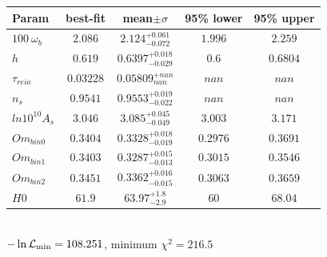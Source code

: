 \begin{tabular}{|l|c|c|c|c|} 
 \hline 
Param & best-fit & mean$\pm\sigma$ & 95\% lower & 95\% upper \\ \hline 
$100~\omega{}_{b }$ &$2.086$ & $2.124_{-0.072}^{+0.061}$ & $1.996$ & $2.259$ \\ 
$h$ &$0.619$ & $0.6397_{-0.029}^{+0.018}$ & $0.6$ & $0.6804$ \\ 
$\tau{}_{reio }$ &$0.03228$ & $0.05809_{nan}^{+nan}$ & $nan$ & $nan$ \\ 
$n_{s }$ &$0.9541$ & $0.9553_{-0.022}^{+0.019}$ & $nan$ & $nan$ \\ 
$ln10^{10}A_{s }$ &$3.046$ & $3.085_{-0.049}^{+0.045}$ & $3.003$ & $3.171$ \\ 
$Om_{bin0 }$ &$0.3404$ & $0.3328_{-0.019}^{+0.018}$ & $0.2976$ & $0.3691$ \\ 
$Om_{bin1 }$ &$0.3403$ & $0.3287_{-0.013}^{+0.015}$ & $0.3015$ & $0.3546$ \\ 
$Om_{bin2 }$ &$0.3451$ & $0.3362_{-0.015}^{+0.016}$ & $0.3063$ & $0.3659$ \\ 
$H0$ &$61.9$ & $63.97_{-2.9}^{+1.8}$ & $60$ & $68.04$ \\ 
\hline 
 \end{tabular} \\ 
$-\ln{\cal L}_\mathrm{min} =108.251$, minimum $\chi^2=216.5$ \\ 
